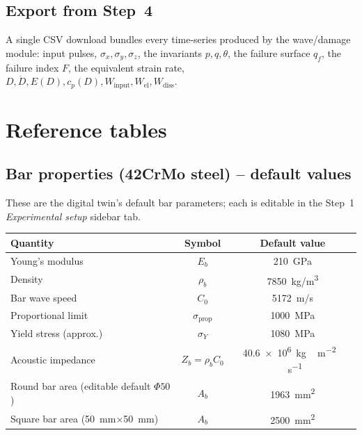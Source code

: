 \documentclass[11pt,a4paper,openany]{book}
\providecommand{\SI}[2]{\qty{#1}{#2}}
\theoremstyle{handbook}
\newcommand{\sig}{\sigma}
\newcommand{\Cz}{C_0}
\newcommand{\Ab}{A_b}
\newcommand{\sigprop}{\sig_{\text{prop}}}
\begin{document}
\section{Export from Step~4}

A single CSV download bundles every time-series produced by the
wave/damage module: input pulses, $\sig_x,\sig_y,\sig_z$, the invariants
$p,q,\theta$, the failure surface $q_f$, the failure index $F$, the
equivalent strain rate, $D,\dot D,E(D),c_p(D),W_{\text{input}},
W_{\text{el}},W_{\text{diss}}$.


\appendix

\chapter{Reference tables}\label{app:tables}

\section{Bar properties (42CrMo steel) -- default values}

These are the digital twin's default bar parameters; each is editable in
the Step~1 \emph{Experimental setup} sidebar tab.

\begin{center}
\begin{tabular}{@{}lcc@{}}
\toprule
\textbf{Quantity} & \textbf{Symbol} & \textbf{Default value} \\
\midrule
Young's modulus & $E_b$ & \SI{210}{GPa} \\
Density & $\rho_b$ & \SI{7850}{kg/m^{3}} \\
Bar wave speed & $\Cz$ & \SI{5172}{m/s} \\
Proportional limit & $\sigprop$ & \SI{1000}{MPa} \\
Yield stress (approx.) & $\sig_Y$ & \SI{1080}{MPa} \\
Acoustic impedance & $Z_b=\rho_b\Cz$ & \SI{40.6e6}{kg\,m^{-2}\,s^{-1}} \\
Round bar area (editable default $\Phi 50$) & $\Ab$ & \SI{1963}{mm^{2}} \\
Square bar area (\SI{50}{mm}$\times$\SI{50}{mm}) & $\Ab$ & \SI{2500}{mm^{2}} \\
\bottomrule
\end{tabular}
\end{center}
\end{document}
